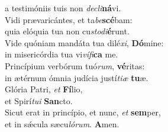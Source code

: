 \oddverse a testimóniis tuis non \textit{de}\textit{cli}\textbf{ná}vi.\\
\evenverse Vidi prævaricántes, et ta\textit{be}\textbf{scé}bam:~\*\\
\evenverse quia elóquia tua non cu\textit{sto}\textit{di}\textbf{é}runt.\\
\oddverse Vide quóniam mandáta tua dilé\textit{xi}, \textbf{Dó}mine:~\*\\
\oddverse in misericórdia tua vi\textit{ví}\textit{fi}\textbf{ca} me.\\
\evenverse Princípium verbórum tuó\textit{rum}, \textbf{vé}ritas:~\*\\
\evenverse in ætérnum ómnia judícia justí\textit{ti}\textit{æ} \textbf{tu}æ.\\
\oddverse Glória Patri, \textit{et} \textbf{Fí}lio,~\*\\
\oddverse et Spirí\textit{tu}\textit{i} \textbf{San}cto.\\
\evenverse Sicut erat in princípio, et nunc, \textit{et} \textbf{sem}per,~\*\\
\evenverse et in sǽcula sæcu\textit{ló}\textit{rum}. \textbf{A}men.\\
